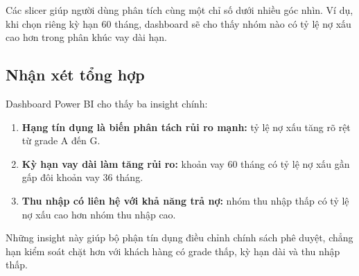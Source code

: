 Các slicer giúp người dùng phân tích cùng một chỉ số dưới nhiều góc nhìn. Ví dụ, khi chọn riêng kỳ hạn 60 tháng, dashboard sẽ cho thấy nhóm nào có tỷ lệ nợ xấu cao hơn trong phân khúc vay dài hạn.

\subsection{Nhận xét tổng hợp}
Dashboard Power BI cho thấy ba insight chính:
\begin{enumerate}
    \item \textbf{Hạng tín dụng là biến phân tách rủi ro mạnh:} tỷ lệ nợ xấu tăng rõ rệt từ grade A đến G.
    \item \textbf{Kỳ hạn vay dài làm tăng rủi ro:} khoản vay 60 tháng có tỷ lệ nợ xấu gần gấp đôi khoản vay 36 tháng.
    \item \textbf{Thu nhập có liên hệ với khả năng trả nợ:} nhóm thu nhập thấp có tỷ lệ nợ xấu cao hơn nhóm thu nhập cao.
\end{enumerate}

Những insight này giúp bộ phận tín dụng điều chỉnh chính sách phê duyệt, chẳng hạn kiểm soát chặt hơn với khách hàng có grade thấp, kỳ hạn dài và thu nhập thấp.
